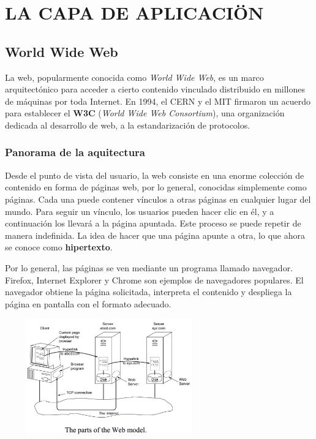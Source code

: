 \documentclass[10pt,a4paper]{report}
\begin{document}
\chapter{LA CAPA DE APLICACIÖN}

	\section{World Wide Web}
	
		\par La web, popularmente conocida como \textit{World Wide Web}, es un marco arquitectónico para acceder a cierto contenido vinculado distribuido en millones de máquinas por toda Internet. En 1994, el CERN y el MIT firmaron un acuerdo para establecer el \textbf{W3C} (\textit{World Wide Web Consortium}), una organización dedicada al desarrollo de web, a la estandarización de protocolos.
		
		\subsection{Panorama de la aquitectura}
		
			\par Desde el punto de vista del usuario, la web consiste en una enorme colección de contenido en forma de páginas web, por lo general, conocidas simplemente como páginas. Cada una puede contener vínculos a otras páginas en cualquier lugar del mundo. Para seguir un vínculo, los usuarios pueden hacer clic en él, y a continuación los llevará a la página apuntada. Este proceso se puede repetir de manera indefinida. La idea de hacer que una página apunte a otra, lo que ahora se conoce como \textbf{hipertexto}.
			
			\par Por lo general, las páginas se ven mediante un programa llamado navegador. Firefox, Internet Explorer y Chrome son ejemplos de navegadores populares. El navegador obtiene la página solicitada, interpreta el contenido y despliega la página en pantalla con el formato adecuado.
			
			\begin{center}
				\includegraphics[width=9cm, height=5cm]{./imagenes/web.png} 
			\end{center}
			
\end{document}
